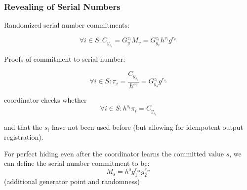\documentclass{article}
\begin{document}
\subsubsection{Revealing of Serial Numbers}

Randomized serial number commitments:

\[ \forall i \in S: C_{y_{s_i}}=G^{z_i}_{y}M_v=G^{z_i}_{y_{v}}h^{v_i}g^{r_{v_i}} \]

Proofs of commitment to serial number:

\[ \forall i \in S: \pi_i=\frac{C_{y_{s_i}}}{h^{s_i}} = G_{y_s}^{z_i} g^{r_{s_i}} \]

coordinator checks whether \[ \forall i \in S: h^{s_i} \pi_i = C_{y_{s_i}} \]

and that the $s_i$ have not been used before (but allowing for idempotent output registration).

For perfect hiding even after the coordinator learns the committed value $s$, we can define the serial number commitment to be: \[ M_s = h^s g_1^{r_{s1}} g_2^{r_{s2}} \] (additional generator point and randomness)
\end{document}
